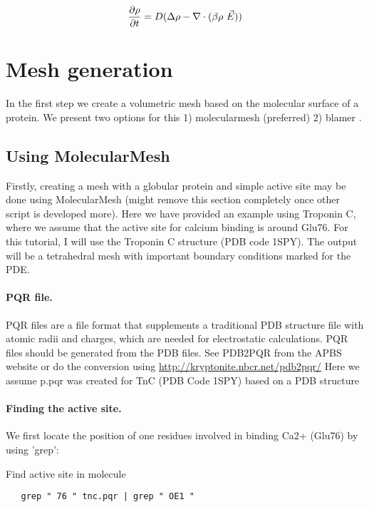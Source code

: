 \documentclass{article}
\begin{document}
\begin{equation}
\label{eq:smol-time-dep}
\frac{\partial\rho}{\partial t} = D(\Delta\rho -\nabla\cdot(\beta\rho~\vec E)) 
\end{equation}




\section{Mesh generation} 
\label{meshgen}
In the first step we create a volumetric mesh based on the molecular surface of a protein. We present two options for this 1) molecularmesh (preferred)  2) blamer .



\subsection{Using MolecularMesh}
\label{molecmesh}
Firstly, creating a mesh with a globular protein and simple active site
may be done using MolecularMesh (might remove this section completely
once other script is developed more). Here we have provided an example
using Troponin C, where we assume that the active site for calcium
binding is around Glu76. For this tutorial, I will use the Troponin C
structure (PDB code 1SPY). The output will be a tetrahedral mesh with important boundary conditions marked for the PDE.

\paragraph{PQR file.}
PQR files are a file format that supplements a traditional PDB structure file with atomic radii and charges, which are needed for electrostatic calculations.
PQR files should be generated from the PDB files. See PDB2PQR from the
APBS website or do the conversion using
\url{http://kryptonite.nbcr.net/pdb2pqr/}
Here we assume p.pqr was created for TnC (PDB Code 1SPY) based on a PDB structure 

\paragraph{Finding the active site.}
We first locate the position of one residues involved in binding Ca2+ (Glu76) by using 'grep':

Find active site in molecule
\begin{verbatim}
   grep " 76 " tnc.pqr | grep " OE1 "
\end{verbatim}
\end{document}
